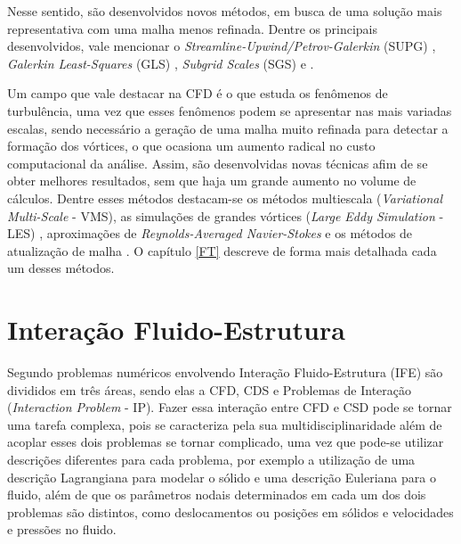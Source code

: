 \documentclass[_ArquivoPrincipal.tex]{subfiles}
\begin{document}
Nesse sentido, são desenvolvidos novos métodos, em busca de uma solução mais representativa com uma malha menos refinada. Dentre os principais desenvolvidos, vale mencionar o \textit{Streamline-Upwind/Petrov-Galerkin} (SUPG) \cite{brooks1982streamline}, \textit{Galerkin Least-Squares} (GLS) \cite{hughes1989new,tezduyar1991stabilized}, \textit{Subgrid Scales} (SGS) e \cite{hughes1995multiscale}.

Um campo que vale destacar na CFD é o que estuda os fenômenos de turbulência, uma vez que esses fenômenos podem se apresentar nas mais variadas escalas, sendo necessário a geração de uma malha muito refinada para detectar a formação dos vórtices, o que ocasiona um aumento radical no custo computacional da análise. Assim, são desenvolvidas novas técnicas afim de se obter melhores resultados, sem que haja um grande aumento no volume de cálculos. Dentre esses métodos destacam-se os métodos multiescala (\textit{Variational Multi-Scale} - VMS), as simulações de grandes vórtices (\textit{Large Eddy Simulation} - LES) \cite{hughes1995multiscale,hughes1998variational,hughes2002variational,bazilevs2010large,vsekutkovski2021partitioned}, aproximações de \textit{Reynolds-Averaged Navier-Stokes} \cite{alfonsi2009reynolds} e os métodos de atualização de malha \cite{de1993petrov}. O capítulo \ref{FT} descreve de forma mais detalhada cada um desses métodos.

\section{Interação Fluido-Estrutura} \label{IFE}

Segundo  problemas numéricos envolvendo Interação Fluido-Estrutura (IFE) são divididos em três áreas, sendo elas a CFD, CDS e Problemas de Interação (\textit{Interaction Problem} - IP). Fazer essa interação entre CFD e CSD pode se tornar uma tarefa complexa, pois se caracteriza pela sua multidisciplinaridade \cite{hou2012numerical} além de acoplar esses dois problemas se tornar complicado, uma vez que pode-se utilizar descrições diferentes para cada problema, por exemplo a utilização de uma descrição Lagrangiana para modelar o sólido e uma descrição Euleriana para o fluido, além de que os parâmetros nodais determinados em cada um dos dois problemas são distintos, como deslocamentos ou posições em sólidos e velocidades e pressões no fluido.
\end{document}
